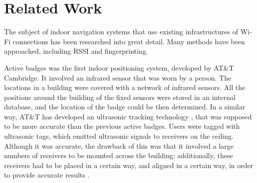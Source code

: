 \section{Related Work}

The subject of indoor navigation systems that use existing infrastructures of Wi-Fi connections has been researched into great detail. Many methods have been approached, including RSSI and fingerprinting.



Active badges \cite{ips-survey-paper} was the first indoor positioning system, developed by AT\&T Cambridge. It involved an infrared sensor that was worn by a person. The locations in a building were covered with a network of infrared sensors. All the positions around the building of the fixed sensors were stored in an internal database, and the location of the badge could be then determined. In a similar way, AT\&T has developed an ultrasonic tracking technology \cite{ips-survey-paper}, that was supposed to be more accurate than the previous active badges. Users were tagged with ultrasonic tags, which emitted ultrasonic signals to receivers on the ceiling. Although it was accurate, the drawback of this was that it involved a large numbers of receivers to be mounted across the building; additionally, these receivers had to be placed in a certain way, and aligned in a certain way, in order to provide accurate results \cite{ips-survey-paper}.

